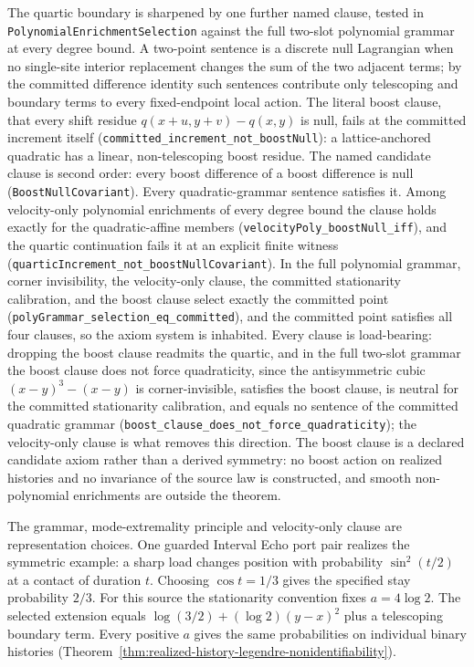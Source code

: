 \documentclass[11pt]{article}
\begin{document}
The quartic boundary is sharpened by one further named clause, tested in
\texttt{Polynomial\-Enrichment\-Selection} against the
full two-slot polynomial grammar at every degree bound. A two-point sentence is
a discrete null Lagrangian when no single-site interior replacement
changes the sum of the two adjacent terms; by the committed difference
identity such sentences contribute only telescoping and boundary terms to
every fixed-endpoint local action. The literal boost clause, that every
shift residue \(q(x+u,y+v)-q(x,y)\) is null, fails at the committed
increment itself (\texttt{committed\_increment\_not\_boostNull}): a
lattice-anchored quadratic has a linear, non-telescoping boost residue.
The named candidate clause is second order: every boost difference of a
boost difference is null (\texttt{BoostNullCovariant}). Every
quadratic-grammar sentence satisfies it. Among velocity-only polynomial
enrichments of every degree bound the clause holds exactly for the
quadratic-affine members (\texttt{velocityPoly\_boostNull\_iff}), and the
quartic continuation fails it at an explicit finite witness
(\texttt{quarticIncrement\_not\_boostNullCovariant}). In the full
polynomial grammar, corner invisibility, the velocity-only clause, the
committed stationarity calibration, and the boost clause select exactly
the committed point (\texttt{polyGrammar\_selection\_eq\_committed}), and
the committed point satisfies all four clauses, so the axiom system is
inhabited. Every clause is load-bearing: dropping the boost clause
readmits the quartic, and in the full two-slot grammar the boost clause
does not force quadraticity, since the antisymmetric cubic
\((x-y)^3-(x-y)\) is corner-invisible, satisfies the boost clause, is
neutral for the committed stationarity calibration, and equals no
sentence of the committed quadratic grammar
(\texttt{boost\_clause\_does\_not\_force\_quadraticity}); the
velocity-only clause is what removes this direction. The boost clause is
a declared candidate axiom rather than a derived symmetry: no boost action on realized histories and no invariance
of the source law is constructed, and smooth non-polynomial enrichments
are outside the theorem.

The grammar, mode-extremality principle and velocity-only clause are
representation choices. One guarded Interval Echo port pair realizes the
symmetric example: a sharp load changes position with probability
$\sin^2(t/2)$ at a contact of duration $t$. Choosing $\cos t=1/3$
gives the specified stay probability $2/3$. For this source the
stationarity convention fixes $a=4\log 2$. The selected extension
equals $\log(3/2)+(\log 2)(y-x)^2$ plus a telescoping boundary
term. Every positive $a$ gives the same probabilities on individual
binary histories
(Theorem~\ref{thm:realized-history-legendre-nonidentifiability}).
\end{document}
